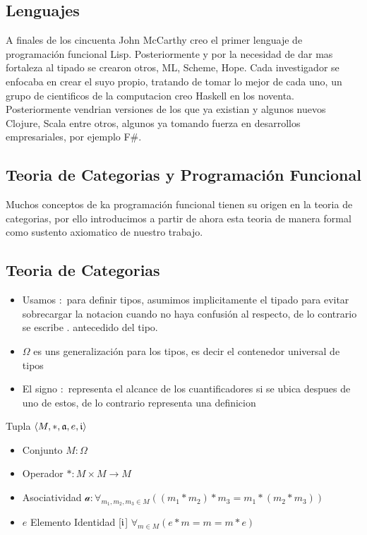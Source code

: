 \subsection{Lenguajes}

A finales de los cincuenta John McCarthy creo el primer lenguaje de programación funcional Lisp. Posteriormente y por la necesidad de dar mas fortaleza al tipado se crearon otros, ML, Scheme, Hope. Cada investigador se enfocaba en crear el suyo propio, tratando de tomar lo mejor de cada uno, un grupo de cientificos de la computacion creo Haskell en los noventa. Posteriormente vendrian versiones de los que ya existian y algunos nuevos Clojure, Scala entre otros, algunos ya tomando fuerza en desarrollos empresariales, por ejemplo F\#.

\subsection{Teoria de Categorias y Programación Funcional}

Muchos conceptos de ka programación funcional tienen su origen en la teoria de categorias, por ello introducimos a partir de ahora esta teoria de manera formal como sustento axiomatico de nuestro trabajo.

\subsection{Teoria de Categorias}

\begin{note}
\begin{itemize}
\item Usamos $:$ para definir tipos, asumimos implicitamente el tipado para evitar sobrecargar la notacion cuando no haya confusión al respecto, de lo contrario se escribe $.$ antecedido del tipo.
\item $\Omega$ es uns generalización para los tipos, es decir el contenedor universal de tipos
\item El signo $:$ representa el alcance de los cuantificadores si se ubica despues de uno de estos, de lo contrario representa una definicion
\end{itemize}
\end{note}

\begin{defn}[Monoide]
\end{defn}
Tupla $\langle M, *, \mathfrak{a}, e, \mathfrak{i} \rangle$ 
\begin{itemize}
\item Conjunto $M: \Omega$
\item Operador $* : M \times M \to M$
\item Asociatividad $\mathcal{a} : \forall_{m_1, m_2, m_3 \in M} ((m_1 * m_2) * m_3 = m_1 * (m_2 * m_3))$
\item $e$ Elemento Identidad [$\mathfrak{i}$] $\forall_{m \in M} ( e * m = m = m * e)$
\end{itemize}

